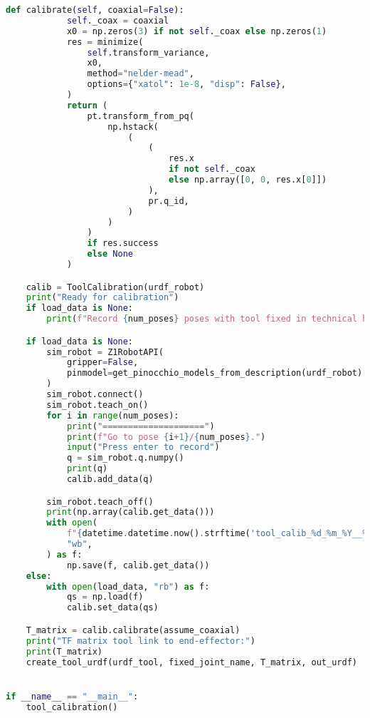 \begin{lstlisting}[language=python, caption=\raggedright{calibration/tool\_calibration.py}, frame=single]
        def calibrate(self, coaxial=False):
            self._coax = coaxial
            x0 = np.zeros(3) if not self._coax else np.zeros(1)
            res = minimize(
                self.transform_variance,
                x0,
                method="nelder-mead",
                options={"xatol": 1e-8, "disp": False},
            )
            return (
                pt.transform_from_pq(
                    np.hstack(
                        (
                            (
                                res.x
                                if not self._coax
                                else np.array([0, 0, res.x[0]])
                            ),
                            pr.q_id,
                        )
                    )
                )
                if res.success
                else None
            )

    calib = ToolCalibration(urdf_robot)
    print("Ready for calibration")
    if load_data is None:
        print(f"Record {num_poses} poses with tool fixed in technical hole")

    if load_data is None:
        sim_robot = Z1RobotAPI(
            gripper=False,
            pinmodel=get_pinocchio_models_from_description(urdf_robot)[0],
        )
        sim_robot.connect()
        sim_robot.teach_on()
        for i in range(num_poses):
            print("====================")
            print(f"Go to pose {i+1}/{num_poses}.")
            input("Press enter to record")
            q = sim_robot.q.numpy()
            print(q)
            calib.add_data(q)

        sim_robot.teach_off()
        print(np.array(calib.get_data()))
        with open(
            f"{datetime.datetime.now().strftime('tool_calib_%d_%m_%Y__%H:%M:%S')}.npy",
            "wb",
        ) as f:
            np.save(f, calib.get_data())
    else:
        with open(load_data, "rb") as f:
            qs = np.load(f)
            calib.set_data(qs)

    T_matrix = calib.calibrate(assume_coaxial)
    print("TF matrix tool link to end-effector:")
    print(T_matrix)
    create_tool_urdf(urdf_tool, fixed_joint_name, T_matrix, out_urdf)


if __name__ == "__main__":
    tool_calibration()

\end{lstlisting}